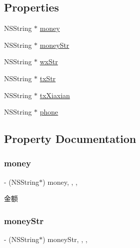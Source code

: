\subsection*{Properties}
\begin{DoxyCompactItemize}
\item 
N\+S\+String $\ast$ \mbox{\hyperlink{interface_f_n_withdraw_m_odel_af9d8ec46d09b1e9aac5ffcc224310d56}{money}}
\item 
N\+S\+String $\ast$ \mbox{\hyperlink{interface_f_n_withdraw_m_odel_ac5e1681cdf89c10dc1d25afe55605043}{money\+Str}}
\item 
N\+S\+String $\ast$ \mbox{\hyperlink{interface_f_n_withdraw_m_odel_aaf44a0fac477d0d49b9693d9aadd5567}{wx\+Str}}
\item 
N\+S\+String $\ast$ \mbox{\hyperlink{interface_f_n_withdraw_m_odel_a8cebb5452541b1ce80c601330972778d}{tx\+Str}}
\item 
N\+S\+String $\ast$ \mbox{\hyperlink{interface_f_n_withdraw_m_odel_aa8262155a836206a3c0148cc267e46bc}{tx\+Xiaxian}}
\item 
N\+S\+String $\ast$ \mbox{\hyperlink{interface_f_n_withdraw_m_odel_af10bd4beddc64c841c3b4b63a7358d2f}{phone}}
\end{DoxyCompactItemize}


\subsection{Property Documentation}
\mbox{\label{interface_f_n_withdraw_m_odel_af9d8ec46d09b1e9aac5ffcc224310d56}} 
\subsubsection{\texorpdfstring{money}{money}}
{\footnotesize\ttfamily -\/ (N\+S\+String$\ast$) money\hspace{0.3cm}{\ttfamily [read]}, {\ttfamily [write]}, {\ttfamily [nonatomic]}, {\ttfamily [copy]}}

金额 \mbox{\label{interface_f_n_withdraw_m_odel_ac5e1681cdf89c10dc1d25afe55605043}} 
\subsubsection{\texorpdfstring{money\+Str}{moneyStr}}
{\footnotesize\ttfamily -\/ (N\+S\+String$\ast$) money\+Str\hspace{0.3cm}{\ttfamily [read]}, {\ttfamily [write]}, {\ttfamily [nonatomic]}, {\ttfamily [copy]}}

